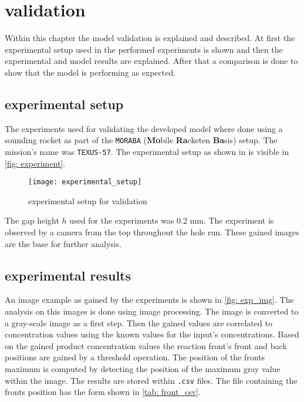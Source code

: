 \documentclass[../thesis.tex]{subfiles}
\begin{document}
\chapter{validation}
\label{chp:validation}

Within this chapter the model validation is explained and described. At first the experimental setup used in the performed experiments is shown and then the experimental and model results are explained. After that a comparison is done to show that the model is performing as expected.

\section{experimental setup}

The experiments used for validating the developed model where done using a sounding rocket as part of the \texttt{MORABA} (\textbf{Mo}bile \textbf{Ra}cketen \textbf{Ba}sis) \cite{stamminger2012moraba} setup. The mission's name was \texttt{TEXUS-57}. The experimental setup as shown in \cite{stergiou2022effects} is visible in \autoref{fig: experiment}.
\begin{figure}[htbp]
	\centering
	\texttt{[image: experimental\_setup]}
	\caption{experimental setup for validation \cite{stergiou2022effects}}
	\label{fig: experiment}
\end{figure}
The gap height $h$ used for the experiments was 0.2 mm. The experiment is observed by a camera from the top throughout the hole run. These gained images are the base for further analysis.

\section{experimental results}

An image example as gained by the experiments is shown in \autoref{fig: exp_img}. The analysis on this images is done using image processing. The image is converted to a gray-scale image as a first step. Then the gained values are correlated to concentration values using the known values for the input's concentrations. Based on the gained product concentration values the reaction front's front and back positions are gained by a threshold operation. The position of the fronts maximum is computed by detecting the position of the maximum gray value within the image. The results are stored within \texttt{.csv} files. The file containing the fronts position has the form shown in \autoref{tab: front_csv}. 
\end{document}
